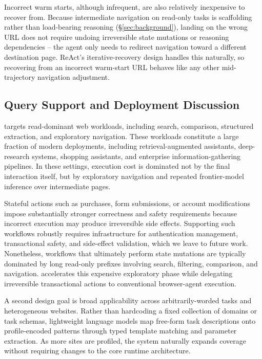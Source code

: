 Incorrect warm starts, although infrequent, are also relatively inexpensive to recover from. Because intermediate navigation on read-only tasks is scaffolding rather than load-bearing reasoning (\S\ref{sec:background}), landing on the wrong URL does not require undoing irreversible state mutations or reasoning dependencies -- the agent only needs to redirect navigation toward a different destination page. ReAct's iterative-recovery design handles this naturally, so recovering from an incorrect warm-start URL behaves like any other mid-trajectory navigation adjustment. %

\subsection{Query Support and Deployment Discussion}

\begin{sloppypar}
\sys targets read-dominant web workloads, including search, comparison, structured extraction, and exploratory navigation. These workloads constitute a large fraction of modern  deployments, including retrieval-augmented assistants, deep-research systems, shopping assistants, and enterprise information-gathering pipelines. In these settings, execution cost is dominated not by the final interaction itself, but by exploratory navigation and repeated frontier-model inference over intermediate pages.
\end{sloppypar}

Stateful actions such as purchases, form submissions, or account modifications impose substantially stronger correctness and safety requirements because incorrect execution may produce irreversible side effects. Supporting such workflows robustly requires infrastructure for authentication management, transactional safety, and side-effect validation, which we leave to future work. Nonetheless, workflows that ultimately perform state mutations are typically dominated by long read-only prefixes involving search, filtering, comparison, and navigation. \sys accelerates this expensive exploratory phase while delegating irreversible transactional actions to conventional browser-agent execution.

A second design goal is broad applicability across arbitrarily-worded tasks and heterogeneous websites. Rather than hardcoding a fixed collection of domains or task schemas, lightweight language models map free-form task descriptions onto profile-encoded patterns through typed template matching and parameter extraction. As more sites are profiled, the system naturally expands coverage without requiring changes to the core runtime architecture.

